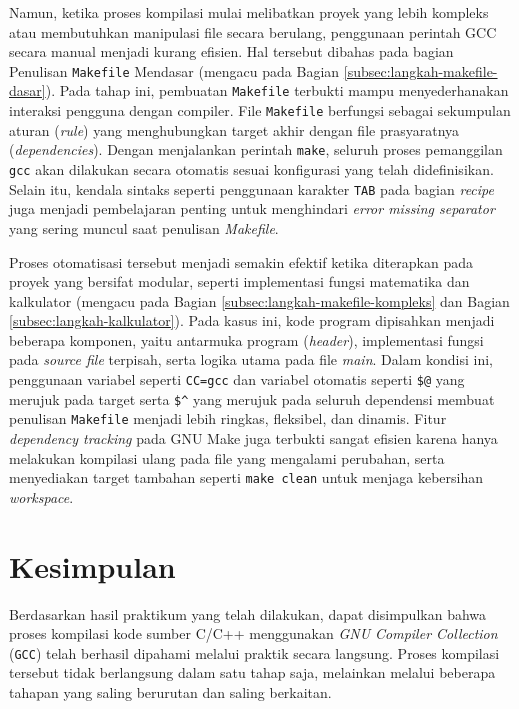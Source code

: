 {Namun, ketika proses kompilasi mulai melibatkan proyek yang lebih kompleks atau membutuhkan manipulasi file secara berulang, penggunaan perintah GCC secara manual menjadi kurang efisien. Hal tersebut dibahas pada bagian Penulisan \texttt{Makefile} Mendasar (mengacu pada Bagian \ref{subsec:langkah-makefile-dasar}). Pada tahap ini, pembuatan \texttt{Makefile} terbukti mampu menyederhanakan interaksi pengguna dengan compiler. File \texttt{Makefile} berfungsi sebagai sekumpulan aturan (\textit{rule}) yang menghubungkan target akhir dengan file prasyaratnya (\textit{dependencies}). Dengan menjalankan perintah \texttt{make}, seluruh proses pemanggilan \texttt{gcc} akan dilakukan secara otomatis sesuai konfigurasi yang telah didefinisikan. Selain itu, kendala sintaks seperti penggunaan karakter \texttt{TAB} pada bagian \textit{recipe} juga menjadi pembelajaran penting untuk menghindari \textit{error missing separator} yang sering muncul saat penulisan \textit{Makefile}.

Proses otomatisasi tersebut menjadi semakin efektif ketika diterapkan pada proyek yang bersifat modular, seperti implementasi fungsi matematika dan kalkulator (mengacu pada Bagian \ref{subsec:langkah-makefile-kompleks} dan Bagian \ref{subsec:langkah-kalkulator}). Pada kasus ini, kode program dipisahkan menjadi beberapa komponen, yaitu antarmuka program (\textit{header}), implementasi fungsi pada \textit{source file} terpisah, serta logika utama pada file \textit{main}. Dalam kondisi ini, penggunaan variabel seperti \texttt{CC=gcc} dan variabel otomatis seperti \verb|$@| yang merujuk pada target serta \verb|$^| yang merujuk pada seluruh dependensi membuat penulisan \texttt{Makefile} menjadi lebih ringkas, fleksibel, dan dinamis. Fitur \textit{dependency tracking} pada GNU Make juga terbukti sangat efisien karena hanya melakukan kompilasi ulang pada file yang mengalami perubahan, serta menyediakan target tambahan seperti \texttt{make clean} untuk menjaga kebersihan \textit{workspace}.

\newpage
\section{Kesimpulan}
\label{sec:kesimpulan}

Berdasarkan hasil praktikum yang telah dilakukan, dapat disimpulkan bahwa proses kompilasi kode sumber C/C++ menggunakan \textit{GNU Compiler Collection} (\texttt{GCC}) telah berhasil dipahami melalui praktik secara langsung. Proses kompilasi tersebut tidak berlangsung dalam satu tahap saja, melainkan melalui beberapa tahapan yang saling berurutan dan saling berkaitan.

}
